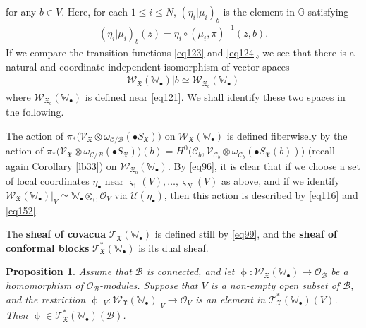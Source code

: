 \documentclass[12pt,a4paper,notitlepage]{report}
\theoremstyle{definition}
\theoremstyle{plain}
\newtheorem{pp}[df]{Proposition}
\newcommand{\fk}{\mathfrak}
\newcommand{\mc}{\mathcal}
\newcommand{\scr}{\mathscr}
\newcommand{\sgm}{\varsigma}
\newcommand{\blt}{\bullet}
\newcommand{\Wbb}{\mathbb W}
\newcommand{\Gbb}{\mathbb G}
\newcommand{\Cbb}{\mathbb C}
\numberwithin{equation}{section}
\begin{document}
for any $b\in V$. Here, for each $1\leq i\leq N$, $(\eta_i|\mu_i)_b$ is the element in $\Gbb$ satisfying
\begin{align}
(\eta_i|\mu_i)_b(z)=\eta_i\circ(\mu_i,\pi)^{-1}(z,b).\label{eq244}
\end{align}
If we compare the transition functions \eqref{eq123} and \eqref{eq124}, we see that there is a natural and coordinate-independent isomorphism of vector spaces
\begin{align*}
\scr W_{\fk X}(\Wbb_\blt)|b\simeq \scr W_{\fk X_b}(\Wbb_\blt)
\end{align*}
where $\scr W_{\fk X_b}(\Wbb_\blt)$ is defined near \eqref{eq121}. We shall identify these two spaces in the following.

The action of $\pi_*\big(\scr V_{\fk X}\otimes\omega_{\mc C/\mc B}(\blt S_{\fk X})\big)$ on $\scr W_{\fk X}(\Wbb_\blt)$ is defined fiberwisely by the action of $\pi_*\big(\scr V_{\fk X}\otimes\omega_{\mc C/\mc B}(\blt S_{\fk X})\big)(b)=H^0\big(\mc C_b,\scr V_{\mc C_b}\otimes\omega_{\mc C_b}(\blt S_{\fk X}(b))\big)$ (recall again Corollary \ref{lb33}) on $\scr W_{\fk X_b}(\Wbb_\blt)$. By \eqref{eq96}, it is clear that if we choose a set of local coordinates $\eta_\blt$ near $\sgm_1(V),\dots,\sgm_N(V)$ as above, and if we  identify $\scr W_{\fk X}(\Wbb_\blt)|_V\simeq\Wbb_\blt\otimes_\Cbb\scr O_V$ via $\mc U(\eta_\blt)$, then this action is described by \eqref{eq116} and \eqref{eq152}.

The \textbf{sheaf of covacua} $\scr T_{\fk X}(\Wbb_\blt)$ is defined still by \eqref{eq99}, and the \textbf{sheaf of conformal blocks} $\scr T_{\fk X}^*(\Wbb_\blt)$ is its dual sheaf.

\begin{pp}\label{lb41}
Assume that $\mc B$ is connected, and let $\upphi:\scr W_{\fk X}(\Wbb_\blt)\rightarrow \scr O_{\mc B}$ be a homomorphism of $\scr O_{\mc B}$-modules. Suppose that $V$ is a non-empty open subset of $\mc B$, and the restriction $\upphi|_V:\scr W_{\fk X}(\Wbb_\blt)|_V\rightarrow \scr O_V$ is  an element in $\scr T_{\fk X}^*(\Wbb_\blt)(V)$. Then $\upphi\in\scr T_{\fk X}^*(\Wbb_\blt)(\mc B)$.
\end{pp}
\end{document}
